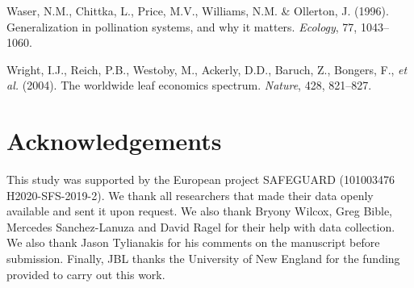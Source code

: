 \documentclass[
  12pt,
  a4paper,
]{article}
\newlength{\cslhangindent}
\newlength{\cslentryspacingunit} %
\newenvironment{CSLReferences}[2] %
 {%
  \setlength{\parindent}{0pt}
  \ifodd #1
  \let\oldpar\par
  \def\par{\hangindent=\cslhangindent\oldpar}
  \fi
  \setlength{\parskip}{#2\cslentryspacingunit}
 }%
 {}
\begin{document}
\begin{CSLReferences}{1}{0}
\leavevmode{}%
Waser, N.M., Chittka, L., Price, M.V., Williams, N.M. \& Ollerton, J. (1996). Generalization in pollination systems, and why it matters. \emph{Ecology}, 77, 1043--1060.

\leavevmode{}%
Wright, I.J., Reich, P.B., Westoby, M., Ackerly, D.D., Baruch, Z., Bongers, F., \emph{et al.} (2004). The worldwide leaf economics spectrum. \emph{Nature}, 428, 821--827.

\end{CSLReferences}

\hypertarget{acknowledgements}{%
\section{Acknowledgements}\label{acknowledgements}}

This study was supported by the European project SAFEGUARD (101003476 H2020-SFS-2019-2). We thank all researchers that made their data openly available and sent it upon request. We also thank Bryony Wilcox, Greg Bible, Mercedes Sanchez-Lanuza and David Ragel for their help with data collection. We also thank Jason Tylianakis for his comments on the manuscript before submission. Finally, JBL thanks the University of New England for the funding provided to carry out this work.
\end{document}
